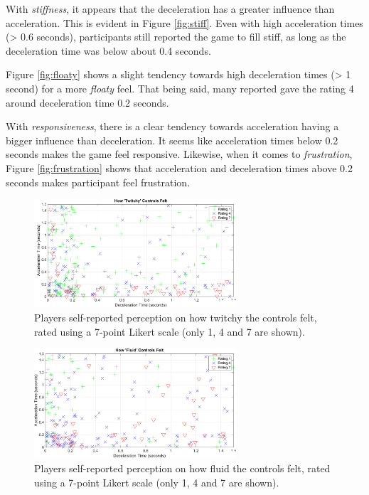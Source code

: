 With \textit{stiffness}, it appears that the deceleration has a greater influence than acceleration. This is evident in Figure \ref{fig:stiff}. Even with high acceleration times (> 0.6 seconds), participants still reported the game to fill stiff, as long as the deceleration time was below about 0.4 seconds.

Figure \ref{fig:floaty} shows a slight tendency towards high deceleration times (> 1 second) for a more \textit{floaty} feel. That being said, many reported gave the rating 4 around deceleration time 0.2 seconds.

With \textit{responsiveness}, there is a clear tendency towards acceleration having a bigger influence than deceleration. It seems like acceleration times below 0.2 seconds makes the game feel responsive. Likewise, when it comes to \textit{frustration}, Figure \ref{fig:frustration} shows that acceleration and deceleration times above 0.2 seconds makes participant feel frustration.

\begin{figure}[htbp]
\centering
\includegraphics[width=0.67\textwidth]{Pics/Classes/Twitchy_classes}
\caption{Players self-reported perception on how twitchy the controls felt, rated using a 7-point Likert scale (only 1, 4 and 7 are shown).}
\label{fig:twitchy}
\end{figure}

\begin{figure}[htbp]
\centering
\includegraphics[width=0.67\textwidth]{Pics/Classes/Fluid_classes}
\caption{Players self-reported perception on how fluid the controls felt, rated using a 7-point Likert scale (only 1, 4 and 7 are shown).}
\label{fig:fluid}
\end{figure}

